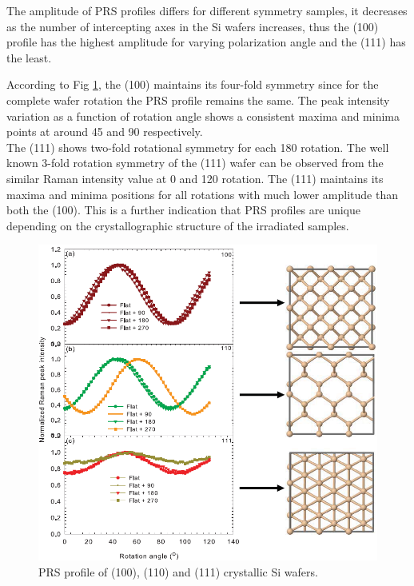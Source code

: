 \documentclass[openany,11pt,a4paper]{report}
\begin{document}
The amplitude of PRS profiles differs for different symmetry samples, it decreases as the number of intercepting axes in the Si wafers increases,
thus the (100) profile has the highest amplitude for varying polarization angle and the (111) has the
least.



According to Fig \ref{profiles}, the (100) maintains its four-fold symmetry since for the complete wafer rotation the PRS profile remains the same. The peak intensity variation as a function of rotation angle shows a consistent maxima and minima points at around 45 and 90 respectively.\\

The (111) shows two-fold rotational symmetry for each 180 rotation. The well known
3-fold rotation symmetry of the (111) wafer can be observed from the similar Raman
intensity value at 0 and 120 rotation. The (111) maintains its maxima and
minima positions for all rotations with much lower amplitude than both the (100).
This is a further indication that PRS profiles are unique depending on the crystallographic
structure of the irradiated samples.\\



\begin{figure}[H]
\centering
\includegraphics[scale=0.7]{Crystalsplots.PNG}
\caption{PRS profile of (100), (110) and (111) crystallic Si wafers. \cite{sos}}
\label{profiles}
\end{figure}
\end{document}
